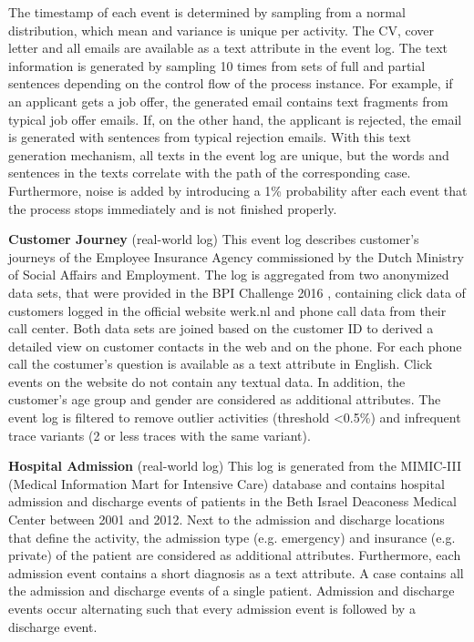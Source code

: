 The timestamp of each event is determined by sampling from a normal distribution, which mean and variance is unique per activity.
The CV, cover letter and all emails are available as a text attribute in the event log.
The text information is generated by sampling 10 times from sets of full and partial sentences depending on the control flow of the process instance.
For example, if an applicant gets a job offer, the generated email contains text fragments from typical job offer emails.
If, on the other hand, the applicant is rejected, the email is generated with sentences from typical rejection emails.
With this text generation mechanism, all texts in the event log are unique, but the words and sentences in the texts correlate with the path of the corresponding case.
Furthermore, noise is added by introducing a 1\% probability after each event that the process stops immediately and is not finished properly.

\textbf{Customer Journey} (real-world log) This event log describes customer's journeys of the Employee Insurance Agency commissioned by the Dutch Ministry of Social Affairs and Employment.
The log is aggregated from two anonymized data sets, that were provided in the BPI Challenge 2016 \cite{bpichallenge2016}, containing click data of customers logged in the official website werk.nl and phone call data from their call center.
Both data sets are joined based on the customer ID to derived a detailed view on customer contacts in the web and on the phone.
For each phone call the costumer's question is available as a text attribute in English.
Click events on the website do not contain any textual data.
In addition, the customer's age group and gender are considered as additional attributes.
The event log is filtered to remove outlier activities (threshold <0.5\%) and infrequent trace variants (2 or less traces with the same variant).

\textbf{Hospital Admission} (real-world log) This log is generated from the MIMIC-III (Medical Information Mart for Intensive Care) database \cite{johnson2016mimic} and contains hospital admission and discharge events of patients in the Beth Israel Deaconess Medical Center between 2001 and 2012.
Next to the admission and discharge locations that define the activity, the admission type (e.g. emergency) and insurance (e.g. private) of the patient are considered as additional attributes.
Furthermore, each admission event contains a short diagnosis as a text attribute.
A case contains all the admission and discharge events of a single patient.
Admission and discharge events occur alternating such that every admission event is followed by a discharge event.

